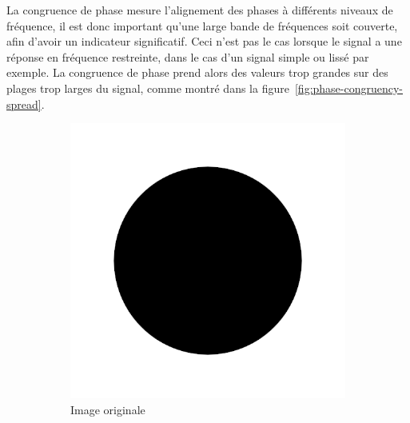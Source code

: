 La congruence de phase mesure l'alignement des phases à différents niveaux de fréquence, il est donc important qu'une large bande de fréquences soit couverte, afin d'avoir un indicateur significatif. Ceci n'est pas le cas lorsque le signal a une réponse en fréquence restreinte, dans le cas d'un signal simple ou lissé par exemple. La congruence de phase prend alors des valeurs trop grandes sur des plages trop larges du signal, comme montré dans la figure~\ref{fig:phase-congruency-spread}.

\bigskip

\begin{figure}
    \centering
    \begin{subfigure}{.22\textwidth}
        \centering
        \includegraphics[width=\textwidth]{contenu/resources/images/disk}
        \caption{Image originale\\}
    \end{subfigure}
    \begin{subfigure}{.22\textwidth}
        \centering

\end{subfigure}
\end{figure}
